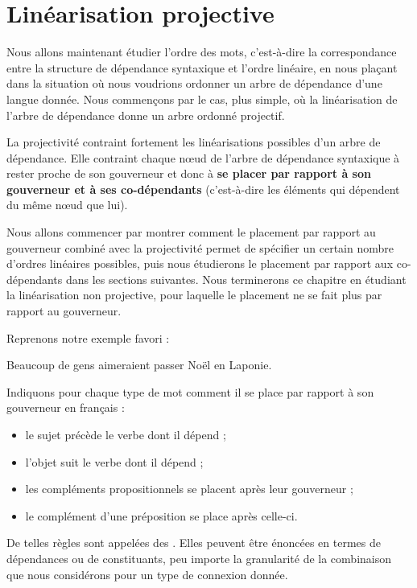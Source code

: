 \section{Linéarisation projective}\label{sec:3.5.18}

Nous allons maintenant étudier l’ordre des mots, c’est-à-dire la correspondance entre la structure de dépendance syntaxique et l’ordre linéaire, en nous plaçant dans la situation où nous voudrions ordonner un arbre de dépendance d’une langue donnée. Nous commençons par le cas, plus simple, où la linéarisation de l’arbre de dépendance donne un arbre ordonné projectif.

La projectivité contraint fortement les linéarisations possibles d’un arbre de dépendance. Elle contraint chaque nœud de l’arbre de dépendance syntaxique à rester proche de son gouverneur et donc à \textbf{se placer par rapport à son gouverneur et à ses co-dépendants} (c’est-à-dire les éléments qui dépendent du même nœud que lui).

Nous allons commencer par montrer comment le placement par rapport au gouverneur combiné avec la projectivité permet de spécifier un certain nombre d’ordres linéaires possibles, puis nous étudierons le placement par rapport aux co-dépendants dans les sections suivantes. Nous terminerons ce chapitre en étudiant la linéarisation non projective, pour laquelle le placement ne se fait plus par rapport au gouverneur.

Reprenons notre exemple favori :

\ea
{Beaucoup de gens aimeraient passer Noël en Laponie}.
\z

Indiquons pour chaque type de mot comment il se place par rapport à son gouverneur en français :

\begin{itemize}
\item le sujet précède le verbe dont il dépend ;
\item l’objet suit le verbe dont il dépend ;
\item les compléments propositionnels se placent après leur gouverneur ;
\item le complément d’une préposition se place après celle-ci.
\end{itemize}

De telles règles sont appelées des . Elles peuvent être énoncées en termes de dépendances ou de constituants, peu importe la granularité de la combinaison que nous considérons pour un type de connexion donnée.

